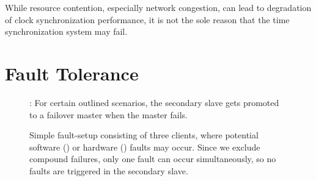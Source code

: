While resource contention, especially network congestion, can lead to degradation of clock synchronization performance, it is not the sole reason that the time synchronization system may fail.


\section{Fault Tolerance}
\label{sec:fault_tolerance}
\newcommand{\faultLength}{30 seconds}

\begin{figure}
    \begin{center}
    \end{center}

    \scriptsize *: For certain outlined scenarios, the secondary slave gets promoted to a failover master when the master fails.

    \caption{
        Simple fault-setup consisting of three clients, where potential software (\faBug{}) or hardware (\faBolt{}) faults may occur. Since we exclude compound failures, only one fault can occur simultaneously, so no faults are triggered in the secondary slave.
    }
    \label{fig:fault_architecture}
\end{figure}

